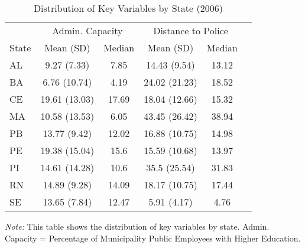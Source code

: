 \begin{table}[htbp]
\centering
\caption{Distribution of Key Variables by State (2006)}
\label{tab:state_distribution}
\small
\begin{tabular}{lccccc}
\toprule
& \multicolumn{2}{c}{Admin. Capacity} & \multicolumn{2}{c}{Distance to Police} \\
\cmidrule(lr){2-3} \cmidrule(lr){4-5}
State & Mean (SD) & Median & Mean (SD) & Median \\
\midrule
AL & 9.27 (7.33) & 7.85 & 14.43 (9.54) & 13.12 \\
BA & 6.76 (10.74) & 4.19 & 24.02 (21.23) & 18.52 \\
CE & 19.61 (13.03) & 17.69 & 18.04 (12.66) & 15.32 \\
MA & 10.58 (13.53) & 6.05 & 43.45 (26.42) & 38.94 \\
PB & 13.77 (9.42) & 12.02 & 16.88 (10.75) & 14.98 \\
PE & 19.38 (15.04) & 15.6 & 15.59 (10.68) & 13.97 \\
PI & 14.61 (14.28) & 10.6 & 35.5 (25.54) & 31.83 \\
RN & 14.89 (9.28) & 14.09 & 18.17 (10.75) & 17.44 \\
SE & 13.65 (7.84) & 12.47 & 5.91 (4.17) & 4.76 \\
\bottomrule
\end{tabular}
\parbox{\textwidth}{
\footnotesize
\textit{Note:} This table shows the distribution of key variables by state. Admin. Capacity = Percentage of Municipality Public Employees with Higher Education.
}
\end{table}
